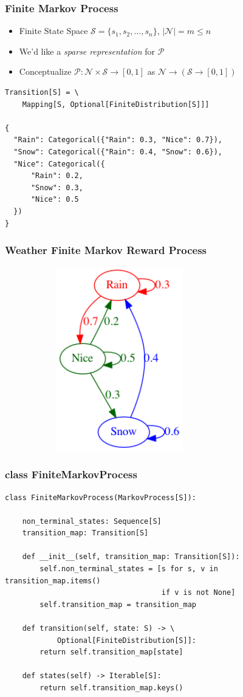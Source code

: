\documentclass[handout]{beamer}
\begin{document}
\begin{frame}[fragile]
\frametitle{Finite Markov Process}
\pause
\begin{itemize}[<+->]
\item Finite State Space $\mathcal{S} = \{s_1, s_2, \ldots, s_n\}$, $|\mathcal{N}| = m\leq n$
\item We'd like a {\em sparse representation} for $\mathcal{P}$
\item Conceptualize $\mathcal{P} : \mathcal{N} \times \mathcal{S} \rightarrow [0, 1]$ as $\mathcal{N} \rightarrow (\mathcal{S} \rightarrow [0, 1])$
\end{itemize}
\pause
\begin{lstlisting}
Transition[S] = \
    Mapping[S, Optional[FiniteDistribution[S]]]

{
  "Rain": Categorical({"Rain": 0.3, "Nice": 0.7}),
  "Snow": Categorical({"Rain": 0.4, "Snow": 0.6}),
  "Nice": Categorical({
      "Rain": 0.2,
      "Snow": 0.3,
      "Nice": 0.5
  })
}
\end{lstlisting}
\end{frame}

\begin{frame}
\frametitle{Weather Finite Markov Reward Process}
\includegraphics[width=10cm, height=8cm]{weather_mp.png}
\end{frame}

\begin{frame}[fragile]
\frametitle{class FiniteMarkovProcess}
\pause
\begin{lstlisting}
class FiniteMarkovProcess(MarkovProcess[S]):
    
    non_terminal_states: Sequence[S]
    transition_map: Transition[S]

    def __init__(self, transition_map: Transition[S]):
        self.non_terminal_states = [s for s, v in transition_map.items()
                                    if v is not None]
        self.transition_map = transition_map

    def transition(self, state: S) -> \
            Optional[FiniteDistribution[S]]:
        return self.transition_map[state]

    def states(self) -> Iterable[S]:
        return self.transition_map.keys()
\end{lstlisting}
\end{frame}
\end{document}
